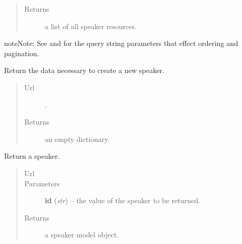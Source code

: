 \documentclass[letterpaper,10pt,english]{sphinxmanual}
\begin{document}
\begin{fulllineitems}
\begin{fulllineitems}
\begin{quote}
\begin{description}
\item[{Returns}] \leavevmode
a list of all speaker resources.

\end{description}\end{quote}

\begin{notice}{note}{Note:}
See  and  for the
query string parameters that effect ordering and pagination.
\end{notice}

\end{fulllineitems}


\begin{fulllineitems}
\label{api:onlinelinguisticdatabase.controllers.speakers.SpeakersController.new}
Return the data necessary to create a new speaker.
\begin{quote}\begin{description}
\item[{Url }] \leavevmode
{}.

\item[{Returns}] \leavevmode
an empty dictionary.

\end{description}\end{quote}

\end{fulllineitems}


\begin{fulllineitems}
\label{api:onlinelinguisticdatabase.controllers.speakers.SpeakersController.show}
Return a speaker.
\begin{quote}\begin{description}
\item[{Url }] \leavevmode
{}

\item[{Parameters}] \leavevmode
\textbf{id} (\emph{str}) -- the  value of the speaker to be returned.

\item[{Returns}] \leavevmode
a speaker model object.


\end{description}
\end{quote}
\end{fulllineitems}
\end{fulllineitems}
\end{document}
